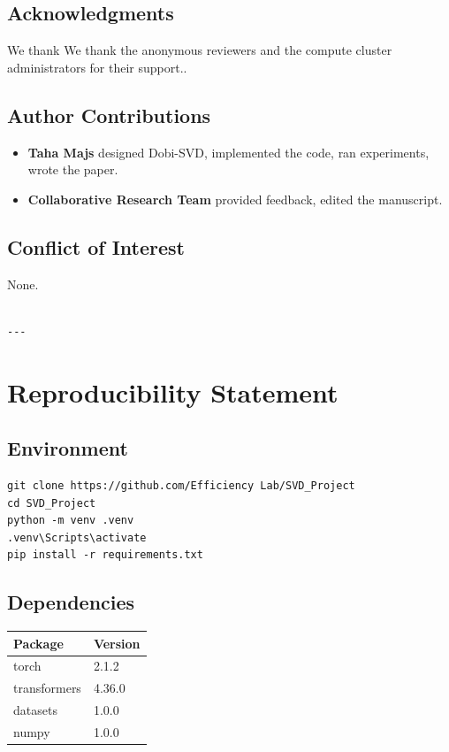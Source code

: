 \subsection{Acknowledgments}

We thank We thank the anonymous reviewers and the compute cluster administrators for their support..

\subsection{Author Contributions}

\begin{itemize}
\item \textbf{Taha Majs} designed Dobi-SVD, implemented the code, ran experiments,
  wrote the paper.
\item \textbf{Collaborative Research Team} provided feedback, edited the manuscript.

\end{itemize}
\subsection{Conflict of Interest}

None.
\begin{lstlisting}

---
\end{lstlisting}


\section{Reproducibility Statement}

\subsection{Environment}

\begin{lstlisting}
git clone https://github.com/Efficiency Lab/SVD_Project
cd SVD_Project
python -m venv .venv
.venv\Scripts\activate
pip install -r requirements.txt
\end{lstlisting}

\subsection{Dependencies}

\begin{table}[H]
\centering
\small
\begin{tabular}{ll}
\toprule
\textbf{Package} & \textbf{Version} \\
\midrule
torch & 2.1.2 \\
transformers & 4.36.0 \\
datasets & 1.0.0 \\
numpy & 1.0.0 \\
\bottomrule
\end{tabular}
\end{table}

